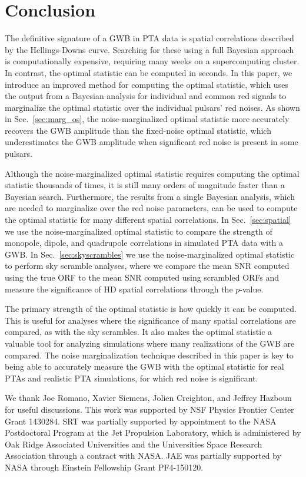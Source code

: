 \documentclass[twocolumn,aps,prd,superscriptaddress]{revtex4-1}
\begin{document}
\section{Conclusion}
\label{sec:conclusion}

The definitive signature of a GWB in PTA data is spatial correlations 
described by the Hellings-Downs curve. 
Searching for these using a full Bayesian approach is computationally expensive, 
requiring many weeks on a supercomputing cluster. 
In contrast, the optimal statistic can be computed in seconds. 
In this paper, we introduce an improved method 
for computing the optimal statistic, 
which uses the output from a Bayesian analysis 
for individual and common red signals 
to marginalize the optimal statistic over the individual pulsars' red noises. 
As shown in Sec.~\ref{sec:marg_os}, 
the noise-marginalized optimal statistic more accurately recovers the GWB amplitude 
than the fixed-noise optimal statistic, which underestimates the GWB amplitude 
when significant red noise is present in some pulsars.

Although the noise-marginalized optimal statistic 
requires computing the optimal statistic thousands of times, 
it is still many orders of magnitude faster than a Bayesian search. 
Furthermore, the results from a single Bayesian analysis, 
which are needed to marginalize over the red noise parameters, 
can be used to compute the optimal statistic for many different spatial correlations. 
In Sec.~\ref{sec:spatial} we use the noise-marginalized optimal statistic 
to compare the strength of monopole, dipole, and quadrupole correlations 
in simulated PTA data with a GWB. 
In Sec.~\ref{sec:skyscrambles} we use the noise-marginalized optimal statistic 
to perform sky scramble analyses, where we compare the mean SNR 
computed using the true ORF to the mean SNR computed using scrambled ORFs 
and measure the significance of HD spatial correlations through the $p$-value.

The primary strength of the optimal statistic is how quickly it can be computed. 
This is useful for analyses where the significance of many spatial correlations are compared, 
as with the sky scrambles. 
It also makes the optimal statistic a valuable tool for analyzing simulations 
where many realizations of the GWB are compared. 
The noise marginalization technique described in this paper is key 
to being able to accurately measure the GWB with the optimal statistic 
for real PTAs and realistic PTA simulations, 
for which red noise is significant.


\acknowledgments
We thank Joe Romano, Xavier Siemens, Jolien Creighton, and Jeffrey Hazboun for useful discussions. 
This work was supported by NSF Physics Frontier Center Grant 1430284. 
SRT was partially supported by appointment to the NASA Postdoctoral Program 
at the Jet Propulsion Laboratory, which is administered by Oak Ridge Associated Universities 
and the Universities Space Research Association through a contract with NASA. 
JAE was partially supported by NASA through Einstein Fellowship Grant PF4-150120. 




\end{document}
